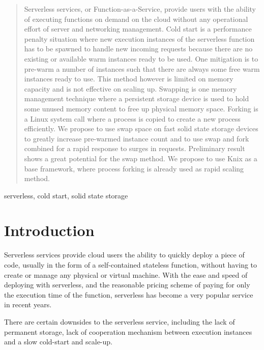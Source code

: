 \documentclass[conference]{IEEEtran}
\begin{document}
\begin{abstract}\label{abstract}
Serverless services, or Function-as-a-Service, provide users with the ability of executing functions on demand on the cloud without any operational effort of server and networking management. Cold start is a performance penalty situation where new execution instances of the serverless function has to be spawned to handle new incoming requests because there are no existing or available warm instances ready to be used. One mitigation is to pre-warm a number of instances such that there are always some free warm instances ready to use. This method however is limited on memory capacity and is not effective on scaling up. Swapping is one memory management technique where a persistent storage device is used to hold some unused memory content to free up physical memory space. Forking is a Linux system call where a process is copied to create a new process efficiently. We propose to use swap space on fast solid state storage devices to greatly increase pre-warmed instance count and to use swap and fork combined for a rapid response to surges in requests. Preliminary result shows a great potential for the swap method. We propose to use Knix as a base framework, where process forking is already used as rapid scaling method.
\end{abstract}

\begin{IEEEkeywords}
serverless, cold start, solid state storage
\end{IEEEkeywords}

\section{Introduction}
Serverless services provide cloud users the ability to quickly deploy a piece of code, usually in the form of a self-contained stateless function, without having to create or manage any physical or virtual machine. With the ease and speed of deploying with serverless, and the reasonable pricing scheme of paying for only the execution time of the function, serverless has become a very popular service in recent years. 

There are certain downsides to the serverless service, including the lack of permanent storage, lack of cooperation mechanism between execution instances and a slow cold-start and scale-up.
\end{document}
